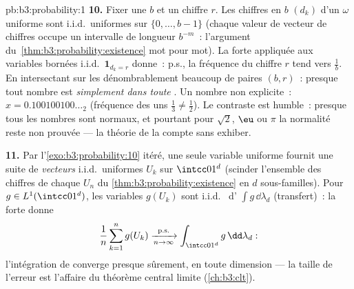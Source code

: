\begin{solution}{pb:b3:probability:1}
\textbf{10.} Fixer une  $b$ et un chiffre $r$. Les
chiffres en  $b$ $(d_k)$ d'un $\omega$ uniforme sont
i.i.d.\ uniformes sur $\{0, \dots, b-1\}$ (chaque valeur de
vecteur de chiffres occupe un intervalle de longueur
$b^{-m}$~: l'argument du~\cref{thm:b3:probability:existence}
mot pour mot). La  forte appliquée aux variables
bornées i.i.d.\ $\mathbf 1_{d_k = r}$ donne~: p.s., la
fréquence du chiffre $r$ tend vers $\frac1b$. En
intersectant sur les dénombrablement beaucoup de paires
$(b, r)$~: presque tout nombre est \emph{simplement 
dans toute }. Un nombre non  explicite~: $x =
0.100100100\ldots_2$ (fréquence des uns $\frac13 \neq
\frac12$). Le contraste est humble~: presque tous les
nombres sont normaux, et pourtant pour $\sqrt2$, $\eu$ ou
$\pi$ la normalité reste non prouvée --- la théorie de la
 compte sans exhiber.

\textbf{11.} Par l'\cref{exo:b3:probability:10} itéré, une
seule variable uniforme fournit une suite de
\emph{vecteurs} i.i.d.\ uniformes $U_k$ sur $\intcc01^d$
(scinder l'ensemble des chiffres de chaque $U_n$ du
\cref{thm:b3:probability:existence} en $d$
sous-familles). Pour $g \in L^1(\intcc01^d)$, les
variables $g(U_k)$ sont i.i.d.\  d'
$\int g\,\dd\lambda_d$ (transfert)~: la  forte donne
\[
\frac1n\sum_{k=1}^ng(U_k)
\xrightarrow[n\to\infty]{\text{p.s.}}
\int_{\intcc01^d}g\,\dd\lambda_d :
\]
l'intégration de  converge presque sûrement, en
toute dimension --- la taille de l'erreur est l'affaire du
théorème central limite (\cref{ch:b3:clt}).


\end{solution}
